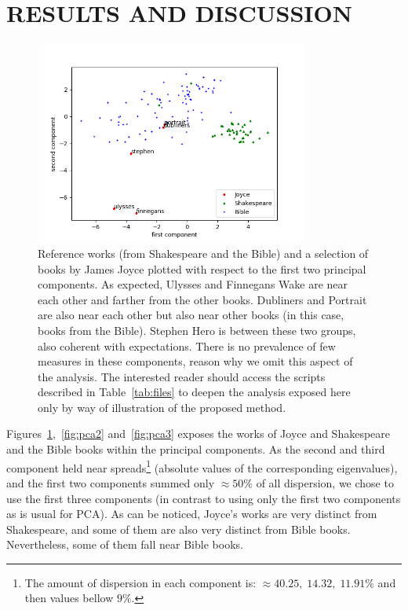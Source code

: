 \documentclass[12pt,fleqn]{article}
\begin{document}
\section{RESULTS AND DISCUSSION}\label{sec:res}

\begin{figure}[!htbp] %
\vspace{-2pt}
\begin{center}
\includegraphics[height=6.7cm,width=9cm]{figs/pca}%
    \caption{Reference works (from Shakespeare and the Bible) and a selection of books by James Joyce plotted with respect to the first two principal components.
    As expected, Ulysses and Finnegans Wake are near each other and farther from the other books. Dubliners and Portrait are also near each other but also near other books (in this case, books from the Bible).
    Stephen Hero is between these two groups, also coherent with expectations.
    There is no prevalence of few measures in these components, reason why we omit this aspect of the analysis.
    The interested reader should access the scripts described in Table~\ref{tab:files} to deepen the analysis exposed here only by way of illustration of the proposed method.}
\label{fig:pca1}%
\end{center}
\end{figure}

Figures~\ref{fig:pca1},~\ref{fig:pca2} and~\ref{fig:pca3} exposes the works of Joyce and
Shakespeare and the Bible books within the principal components.
As the second and third component held near spreads\footnote{The
amount of dispersion in each component is:
$\approx 40.25,\; 14.32,\; 11.91\%$ and then values bellow $9\%$.} (absolute values of the corresponding eigenvalues),
and the first two components summed only $\approx 50\%$ of all dispersion,
we chose to use the first three components (in contrast to using only the first two components as is usual for PCA).
As can be noticed, Joyce's works are very distinct from Shakespeare,
and some of them are also very distinct from Bible books.
Nevertheless, some of them fall near Bible books.
\end{document}
